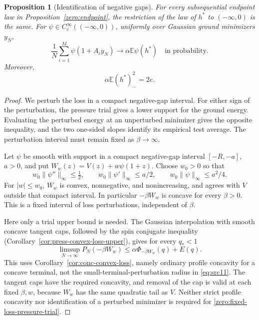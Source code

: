 \documentclass[11pt,a4paper]{article}
\numberwithin{equation}{section}
\newtheorem{proposition}[theorem]{Proposition}
\theoremstyle{definition}
\theoremstyle{remark}
\newcommand{\E}{\mathbb E}
\begin{document}
\begin{proposition}[Identification of negative gaps]
\label{zero:negative-law}
For every subsequential endpoint law in Proposition~\ref{zero:endpoint},
the restriction of the law of $h^*$ to $(-\infty,0)$ is the same.  For
$\psi\in C_c^\infty((-\infty,0))$, uniformly over Gaussian ground
minimizers $y_N$,
\[
 \frac1N\sum_{i=1}^M\psi(1+A_i y_N)
       \longrightarrow\alpha\E\psi(h^*)
 \quad\text{in probability}.
\]
Moreover,
\begin{equation}\label{zero:energy-moment}
 \alpha\E(h^*)_-^2=2e.
\end{equation}
\end{proposition}

\begin{proof}
We perturb the loss in a compact negative-gap interval.  For either
sign of the perturbation, the pressure trial gives a lower support for
the ground energy.  Evaluating the perturbed energy at an unperturbed
minimizer gives the opposite inequality, and the two one-sided slopes
identify its empirical test average.  The perturbation interval must
remain fixed as $\beta\to\infty$.

Let \(\psi\) be smooth with
support in a compact negative-gap interval \([-R,-a]\), \(a>0\), and
put \(W_w(z)=V(z)+w\psi(1+z)\).  Choose \(w_0>0\) so that
\[
 w_0\|\psi''\|_\infty\le\tfrac12,\qquad
 w_0\|\psi'\|_\infty\le a/2,\qquad
 w_0\|\psi\|_\infty\le a^2/4.
\]
For \(|w|\le w_0\), \(W_w\) is convex, nonnegative, and
nonincreasing, and agrees with \(V\) outside that compact interval.
In particular \(-\beta W_w\) is concave for every \(\beta>0\).
This is a fixed interval of loss perturbations, independent of
\(\beta\).

Here only a trial upper bound is needed.  The Gaussian interpolation
with smooth concave tangent caps, followed by the spin conjugate
inequality (Corollary~\ref{cor:press-convex-loss-upper}), gives for
every \(q_*<1\)
\begin{equation}\label{zero:fixed-loss-pressure-trial}
 \limsup_{N\to\infty}P_N(-\beta W_w)
 \le\alpha\Phi_{-\beta W_w}(q)+E(q).
\end{equation}
This uses Corollary~\ref{cor:conc-convex-loss}, namely ordinary
profile concavity for a concave terminal, not the
small-terminal-perturbation radius in \eqref{eq:src11}.  The tangent
caps have the required concavity, and removal of the cap is valid at
each fixed \(\beta,w\), because \(W_w\) has the same quadratic tail
as \(V\).  Neither strict profile concavity nor identification of a
perturbed minimizer is required for
\eqref{zero:fixed-loss-pressure-trial}.


\end{proof}
\end{document}
